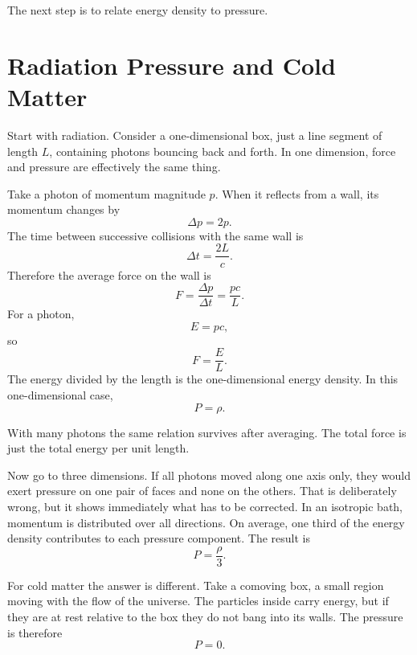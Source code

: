 The next step is to relate energy density to pressure.

\section{Radiation Pressure and Cold Matter}

Start with radiation. Consider a one-dimensional box, just a line segment of length \(L\), containing photons bouncing back and forth. In one dimension, force and pressure are effectively the same thing.

Take a photon of momentum magnitude \(p\). When it reflects from a wall, its momentum changes by
\begin{equation}
\Delta p = 2p.
\end{equation}
The time between successive collisions with the same wall is
\begin{equation}
\Delta t = \frac{2L}{c}.
\end{equation}
Therefore the average force on the wall is
\begin{equation}
F=\frac{\Delta p}{\Delta t}=\frac{pc}{L}.
\end{equation}
For a photon,
\begin{equation}
E=pc,
\end{equation}
so
\begin{equation}
F=\frac{E}{L}.
\end{equation}
The energy divided by the length is the one-dimensional energy density. In this one-dimensional case,
\begin{equation}
P=\rho .
\end{equation}

With many photons the same relation survives after averaging. The total force is just the total energy per unit length.

Now go to three dimensions. If all photons moved along one axis only, they would exert pressure on one pair of faces and none on the others. That is deliberately wrong, but it shows immediately what has to be corrected. In an isotropic bath, momentum is distributed over all directions. On average, one third of the energy density contributes to each pressure component. The result is
\begin{equation}
P=\frac{\rho}{3}.
\end{equation}

For cold matter the answer is different. Take a comoving box, a small region moving with the flow of the universe. The particles inside carry energy, but if they are at rest relative to the box they do not bang into its walls. The pressure is therefore
\begin{equation}
P=0.
\end{equation}

